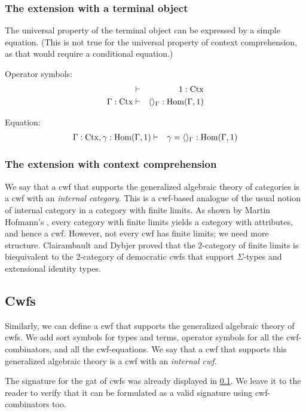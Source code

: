 \documentclass{lmcs}
\def\Ctx{\mathrm{Ctx}}
\def\Hom{\mathrm{Hom}}
\begin{document}
\subsubsection{The extension with a terminal object}
The universal property of the terminal object can be expressed by 
a simple equation. (This is not true for the universal property of
context comprehension, as that would require a conditional equation.) 

Operator symbols:
\begin{eqnarray*}
&\vdash& 1 : \Ctx\\
\Gamma : \Ctx &\vdash& \tuple{}_\Gamma : \Hom(\Gamma,1)
\end{eqnarray*}

Equation:
\begin{eqnarray*}
\Gamma : \Ctx, \gamma : \Hom(\Gamma,1) &\vdash& \gamma = \tuple{}_\Gamma : \Hom(\Gamma,1)
\end{eqnarray*}


\subsubsection{The extension with context comprehension}

We say that a cwf that supports the generalized algebraic theory of categories is a cwf with an {\em internal category}. This is a cwf-based analogue of the usual notion of internal category in a category with finite limits. As shown by Martin Hofmann's \cite{hofmann:csl,hofmann:cambridge}, every category with finite limits yields a category with attributes, and hence a cwf. However, not every cwf has finite limits; we need more structure.  Clairambault and Dybjer \cite{ClairambaultD11,ClairambaultD14} proved that the 2-category of finite limits is biequivalent to the 2-category of democratic cwfs that support $\Sigma$-types and extensional identity types.

\subsection{Cwfs} Similarly, we can define a cwf that supports the generalized algebraic theory of cwfs. We add sort symbols for types and terms, operator symbols for all the cwf-combinators, and all the cwf-equations. We say that a cwf that supports this generalized algebraic theory is a cwf with an {\em internal cwf}.

The signature for the gat of cwfs was already displayed in \ref{}. We leave it to the reader to verify that it can be formulated as a valid signature using cwf-combinators too.
\end{document}
